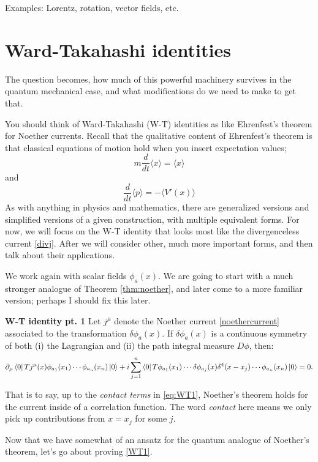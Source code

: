 \documentclass[main.tex]{subfiles}
\begin{document}
Examples: Lorentz, rotation, vector fields, etc.
\section{Ward-Takahashi identities}
The question becomes, how much of this powerful machinery survives in the quantum mechanical case, and what modifications do we need to make to get that.

You should think of Ward-Takahashi (W-T) identities as like Ehrenfest's theorem for Noether currents. Recall that the qualitative content of Ehrenfest's theorem is that classical equations of motion hold when you insert expectation values;
\[
m\frac{d}{dt} \langle x \rangle = \langle x \rangle
\]
and
\[
\frac{d}{dt} \langle p \rangle = - \langle V'(x) \rangle
\]
As with anything in physics and mathematics, there are generalized versions and simplified versions of a given construction, with multiple equivalent forms. For now, we will focus on the W-T identity that looks most like the divergenceless current \ref{divj}. After we will consider other, much more important forms, and then talk about their applications. 

We work again with scalar fields $\phi_a (x)$. We are going to start with a much stronger analogue of Theorem \ref{thm:noether}, and later come to a more familiar version; perhaps I should fix this later.

\begin{thm} \label{thm:WT1}\textbf{W-T identity pt. 1}
Let $j^\mu$ denote the Noether current \ref{noethercurrent} associated to the transformation $\delta \phi_a (x)$. If $\delta \phi_a (x)$ is a continuous symmetry of both (i) the Lagrangian and (ii) the path integral measure $D\phi$, then:
\begin{equation} \label{eq:WT1}
\partial_\mu \bra{0} T j^\mu (x) \phi_{a_1} (x_1) \cdots \phi_{a_n} (x_n) \ket{0} + i \sum_{j=1}^n \bra{0} T \phi_{a_1} (x_1) \cdots \delta \phi_{a_j} (x) \delta^4 (x-x_j) \cdots \phi_{a_n} (x_n) \ket{0} = 0.
\end{equation}
\end{thm}
That is to say, up to the \textit{contact terms} in \ref{eq:WT1}, Noether's theorem holds for the current inside of a correlation function. The word \textit{contact} here means we only pick up contributions from $x = x_j$ for some $j$.

Now that we have somewhat of an ansatz for the quantum analogue of Noether's theorem, let's go about proving \ref{WT1}.
\end{document}

